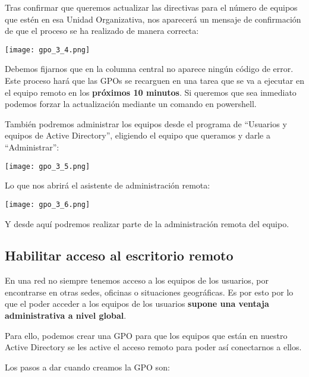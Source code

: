 Tras confirmar que queremos actualizar las directivas para el número de equipos que estén en esa Unidad Organizativa, nos aparecerá un mensaje de confirmación de que el proceso se ha realizado de manera correcta:

\begin{center}
    \texttt{[image: gpo\_3\_4.png]}
\end{center}

Debemos fijarnos que en la columna central no aparece ningún código de error. Este proceso hará que las GPOs se recarguen en una tarea que se va a ejecutar en el equipo remoto en los \textbf{próximos 10 minutos}. Si queremos que sea inmediato podemos forzar la actualización mediante un comando en powershell.

También podremos administrar los equipos desde el programa de “Usuarios y equipos de Active Directory”, eligiendo el equipo que queramos y darle a “Administrar”:

\begin{center}
    \texttt{[image: gpo\_3\_5.png]}
\end{center}

Lo que nos abrirá el asistente de administración remota:

\begin{center}
    \texttt{[image: gpo\_3\_6.png]}
\end{center}

Y desde aquí podremos realizar parte de la administración remota del equipo.


\subsection{Habilitar acceso al escritorio remoto}
En una red no siempre tenemos acceso a los equipos de los usuarios, por encontrarse en otras sedes, oficinas o situaciones geográficas. Es por esto por lo que el poder acceder a los equipos de los usuarios  \textbf{supone una ventaja administrativa a nivel global}.

Para ello, podemos crear una GPO para que los equipos que están en nuestro Active Directory se les active el acceso remoto para poder así conectarnos a ellos.

Los pasos a dar cuando creamos la GPO son:

